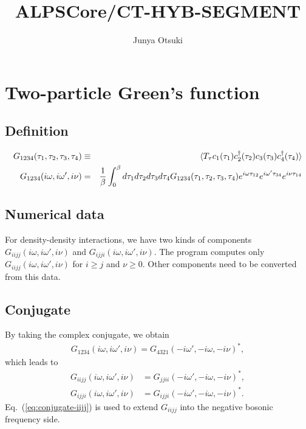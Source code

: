 \documentclass[disablejfam,12pt]{article}
\author{Junya Otsuki}
\begin{document}
\title{ALPSCore/CT-HYB-SEGMENT}
\maketitle
\thispagestyle{empty}

\section{Two-particle Green's function}

\subsection{Definition}
\begin{eqnarray}
 G_{1234}(\tau_1, \tau_2, \tau_3, \tau_4) &\equiv& \braket{T_\tau c_1(\tau_1) c_2^\dagger(\tau_2) c_3(\tau_3) c_4^\dagger(\tau_4)}\\
 G_{1234}(i \omega, i \omega', i\nu) &=& \frac{1}{\beta} \int_0^\beta  d \tau_{1} d \tau_{2} d \tau_{3} d \tau_{4} G_{1234}(\tau_{1}, \tau_{2}, \tau_{3}, \tau_{4}) e^{i\omega \tau_{12}} e^{i\omega' \tau_{34}}e^{i \nu \tau_{14}}
\end{eqnarray}

\subsection{Numerical data}
For density-density interactions, we have two kinds of components
$G_{iijj}(i\omega, i\omega', i\nu)$ and
$G_{ijji}(i\omega, i\omega', i\nu)$.
The program computes only
$G_{iijj}(i\omega, i\omega', i\nu)$ for $i \geq j$ and $\nu \geq 0$.
Other components need to be converted from this data.

\subsection{Conjugate}
By taking the complex conjugate, we obtain
\begin{align}
	G_{1234}(i \omega, i \omega', i\nu) = G_{4321}(-i \omega', -i \omega, -i\nu)^*,
	\label{eq:conjugate}
\end{align}
which leads to
\begin{align}
	G_{iijj}(i \omega, i \omega', i\nu) &= G_{jjii}(-i \omega', -i \omega, -i\nu)^*,
	\label{eq:conjugate-iijj}
	\\
	G_{ijji}(i \omega, i \omega', i\nu) &= G_{ijji}(-i \omega', -i \omega, -i\nu)^*.
\end{align}
Eq.~(\ref{eq:conjugate-iijj}) is used to extend $G_{iijj}$ into the negative bosonic frequency side.
\end{document}
